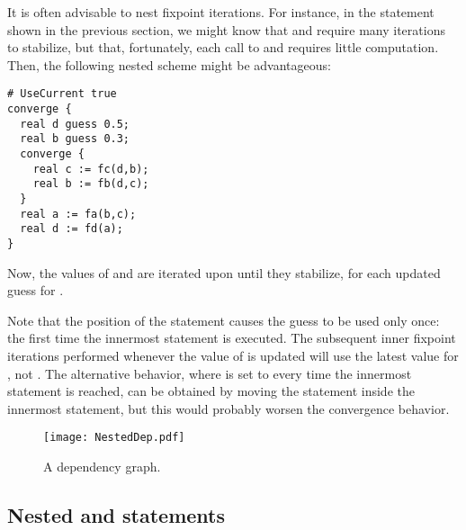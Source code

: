 It is often advisable to nest fixpoint iterations.
For instance, in the  statement shown in the previous
section, we might know that  and 
require many iterations to stabilize, but that, fortunately, each call
to  and  requires little computation.  Then, the
following nested scheme might be advantageous:
\begin{lstlisting}
# UseCurrent true
converge {
  real d guess 0.5;
  real b guess 0.3;
  converge {
    real c := fc(d,b);
    real b := fb(d,c);
  }
  real a := fa(b,c);
  real d := fd(a);
}
\end{lstlisting}
Now, the values of  and  are iterated upon
until they stabilize, for each updated guess for .

Note that the position of the statement  causes
the guess  to be used only once: the first time the innermost
 statement is executed.  The subsequent inner fixpoint
iterations performed whenever the value of  is updated will use the
latest value for , not .  The alternative behavior, where
 is set to  every time the innermost 
statement is reached, can be obtained by moving the statement
 inside the innermost  statement,
but this would probably worsen the convergence behavior.

\begin{figure}
  \centering
  \texttt{[image: NestedDep.pdf]}
  \caption{A  dependency graph.}
  \label{FIG:NestedDep}
\end{figure}

\subsection{Nested  and  statements}

